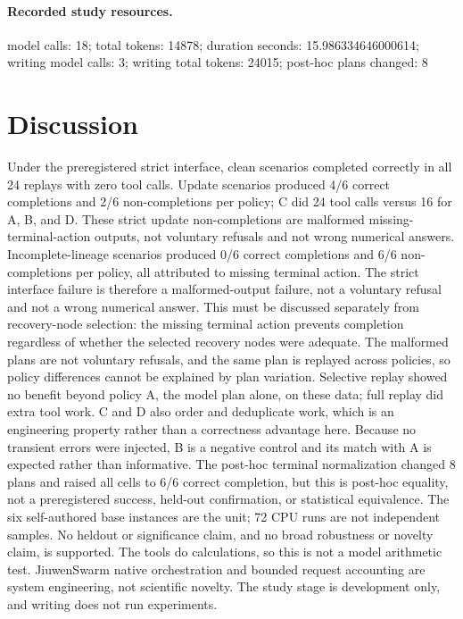 \documentclass{article}
\begin{document}
\paragraph{Recorded study resources.}model calls: 18; total tokens: 14878; duration seconds: 15.986334646000614; writing model calls: 3; writing total tokens: 24015; post-hoc plans changed: 8

\section{Discussion}

Under the preregistered strict interface, clean scenarios completed correctly in all 24 replays with zero tool calls. Update scenarios produced 4/6 correct completions and 2/6 non-completions per policy; C did 24 tool calls versus 16 for A, B, and D. These strict update non-completions are malformed missing-terminal-action outputs, not voluntary refusals and not wrong numerical answers. Incomplete-lineage scenarios produced 0/6 correct completions and 6/6 non-completions per policy, all attributed to missing terminal action. The strict interface failure is therefore a malformed-output failure, not a voluntary refusal and not a wrong numerical answer. This must be discussed separately from recovery-node selection: the missing terminal action prevents completion regardless of whether the selected recovery nodes were adequate. The malformed plans are not voluntary refusals, and the same plan is replayed across policies, so policy differences cannot be explained by plan variation. Selective replay showed no benefit beyond policy A, the model plan alone, on these data; full replay did extra tool work. C and D also order and deduplicate work, which is an engineering property rather than a correctness advantage here. Because no transient errors were injected, B is a negative control and its match with A is expected rather than informative. The post-hoc terminal normalization changed 8 plans and raised all cells to 6/6 correct completion, but this is post-hoc equality, not a preregistered success, held-out confirmation, or statistical equivalence. The six self-authored base instances are the unit; 72 CPU runs are not independent samples. No heldout or significance claim, and no broad robustness or novelty claim, is supported. The tools do calculations, so this is not a model arithmetic test. JiuwenSwarm native orchestration and bounded request accounting are system engineering, not scientific novelty. The study stage is development only, and writing does not run experiments.
\end{document}
